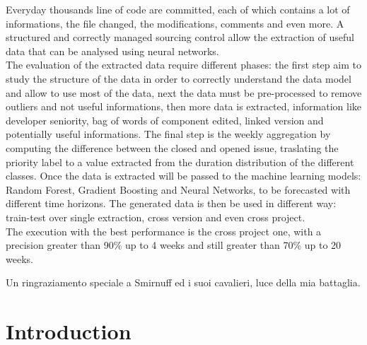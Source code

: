 \documentclass[%
    corpo=12pt,
    twoside,
    oldstyle,
    autoretitolo,
    greek,
    evenboxes,
]{toptesi}
\begin{document}
\frontespizio
\summary
Everyday thousands line of code are committed, each of which contains a lot of informations, the file changed, the modifications, comments and even more. A structured and correctly managed sourcing control allow the extraction of useful data that can be analysed using neural networks.\\
The evaluation of the extracted data require different phases: the first step aim to study the structure of the data in order to correctly understand the data model and allow to use most of the data, next the data must be pre-processed to remove outliers and not useful informations, then more data is extracted, information like developer seniority, bag of words of component edited, linked version and potentially useful informations. The final step is the weekly aggregation by computing the difference between the closed and opened issue, traslating the priority label to a value extracted from the duration distribution of the different classes. Once the data is extracted will be passed to the machine learning models: Random Forest, Gradient Boosting and Neural Networks, to be forecasted with different time horizons. The generated data is then be used in different way: train-test over single extraction, cross version and even cross project.\\
The execution with the best performance is the cross project one, with a precision greater than 90\% up to 4 weeks and still greater than 70\% up to 20 weeks.


\acknowledgements

Un ringraziamento speciale a Smirnuff ed i suoi cavalieri, luce della mia battaglia.

\indici

\mainmatter


\chapter{Introduction}
\label{chap:intro}
\end{document}
